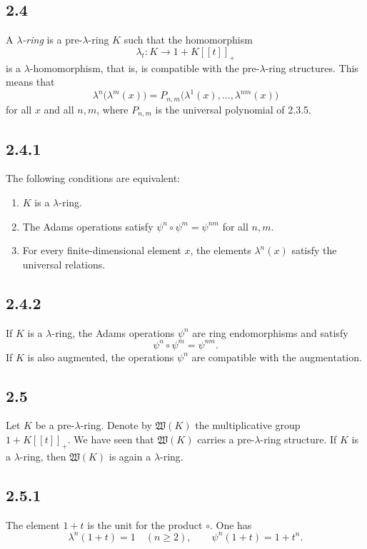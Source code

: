 \documentclass[11pt]{article}
\theoremstyle{plain}
\theoremstyle{definition}
\theoremstyle{remark}
\begin{document}
\subsection*{2.4}
A \emph{$\lambda$-ring} is a pre-$\lambda$-ring $K$ such that the homomorphism
\[
\lambda_t:K\longrightarrow 1+K[[t]]_+
\]
is a $\lambda$-homomorphism, that is, is compatible with the pre-$\lambda$-ring structures. This means that
\begin{equation}\label{eq:2.4}
\lambda^n\bigl(\lambda^m(x)\bigr)=P_{n,m}\bigl(\lambda^1(x),\ldots,\lambda^{nm}(x)\bigr)
\end{equation}
for all $x$ and all $n,m$, where $P_{n,m}$ is the universal polynomial of 2.3.5.

\subsection*{2.4.1}
The following conditions are equivalent:
\begin{enumerate}[label=(\roman*)]
\item $K$ is a $\lambda$-ring.
\item The Adams operations satisfy $\psi^n\circ\psi^m=\psi^{nm}$ for all $n,m$.
\item For every finite-dimensional element $x$, the elements $\lambda^n(x)$ satisfy the universal relations.
\end{enumerate}

\subsection*{2.4.2}
If $K$ is a $\lambda$-ring, the Adams operations $\psi^n$ are ring endomorphisms and satisfy
\begin{equation}\label{eq:2.4.2}
\psi^n\circ\psi^m=\psi^{nm}.
\end{equation}
If $K$ is also augmented, the operations $\psi^n$ are compatible with the augmentation.

\subsection*{2.5}
Let $K$ be a pre-$\lambda$-ring. Denote by $\mathfrak W(K)$ the multiplicative group $1+K[[t]]_+$. We have seen that $\mathfrak W(K)$ carries a pre-$\lambda$-ring structure. If $K$ is a $\lambda$-ring, then $\mathfrak W(K)$ is again a $\lambda$-ring.

\subsection*{2.5.1}
The element $1+t$ is the unit for the product $\circ$. One has
\begin{equation}\label{eq:2.5.1}
\lambda^n(1+t)=1\quad (n\geq 2),
\qquad
\psi^n(1+t)=1+t^n.
\end{equation}
\end{document}
